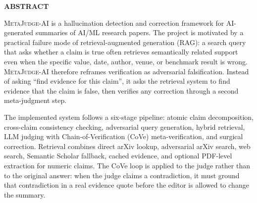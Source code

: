 \documentclass[12pt, a4paper]{report}
\newcommand{\sys}{\textsc{MetaJudge-AI}}
\begin{document}
\newpage
\thispagestyle{empty}
\begin{center}
    {\fontsize{16}{20}\bfseries ABSTRACT}
\end{center}
\vspace{1cm}
\onehalfspacing

\noindent
\sys{} is a hallucination detection and correction framework for AI-generated
summaries of AI/ML research papers. The project is motivated by a practical
failure mode of retrieval-augmented generation (RAG): a search query that asks
whether a claim is true often retrieves semantically related support even when
the specific value, date, author, venue, or benchmark result is wrong. \sys{}
therefore reframes verification as adversarial falsification. Instead of asking
``find evidence for this claim'', it asks the retrieval system to find evidence
that the claim is false, then verifies any correction through a second
meta-judgment step.

\vspace{0.4cm}
\noindent
The implemented system follows a six-stage pipeline: atomic claim
decomposition, cross-claim consistency checking, adversarial query generation,
hybrid retrieval, LLM judging with Chain-of-Verification (CoVe)
meta-verification, and surgical correction. Retrieval combines direct arXiv
lookup, adversarial arXiv search, web search, Semantic Scholar fallback, cached
evidence, and optional PDF-level extraction for numeric claims. The CoVe loop is
applied to the judge rather than to the original answer: when the judge claims a
contradiction, it must ground that contradiction in a real evidence quote before
the editor is allowed to change the summary.
\end{document}
